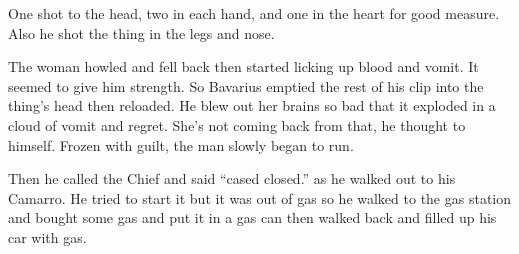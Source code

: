 One shot to the head, two in each hand, and one in the heart for
good measure. Also he shot the thing in the legs and nose.



The woman howled and fell back then started licking up blood and
vomit. It seemed to give him strength. So Bavarius emptied the rest
of his clip into the thing's head then reloaded. He blew out her
brains so bad that it exploded in a cloud of vomit and regret.
She's not coming back from that, he thought to himself. Frozen with
guilt, the man slowly began to run.



Then he called the Chief and said ``cased closed.'' as he walked out
to his Camarro. He tried to start it but it was out of gas so he
walked to the gas station and bought some gas and put it in a gas
can then walked back and filled up his car with gas. 

 



